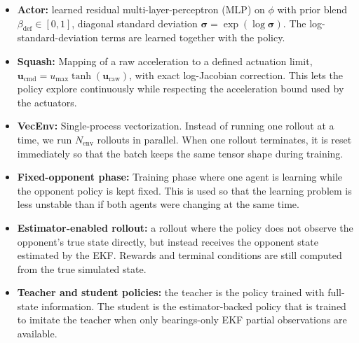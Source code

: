 \begin{itemize}
\item \textbf{Actor:} learned residual multi-layer-perceptron (MLP) on \(\phi\) with prior blend \(\beta_{\mathrm{def}}\in[0,1]\), diagonal standard deviation \(\boldsymbol{\sigma}=\exp(\log\boldsymbol{\sigma})\).  The log-standard-deviation terms are learned together with the policy.
\item \textbf{Squash:} Mapping of a raw  acceleration to a defined actuation limit, \(\mathbf{u}_{\mathrm{cmd}} = u_{\max}\tanh(\mathbf{u}_{\mathrm{raw}})\), with exact log-Jacobian correction. This lets the policy explore continuously while respecting the acceleration bound used by the actuators.
\item \textbf{VecEnv:} Single-process vectorization. Instead of running one rollout at a time, we run \(N_{\mathrm{env}}\) rollouts in parallel. When one rollout terminates, it is reset immediately so that the batch keeps the same tensor shape during training.

\item \textbf{Fixed-opponent phase:} Training phase where one agent is learning while the opponent policy is kept fixed. This is used so that the learning problem is less unstable than if both agents were changing at the same time.

\item \textbf{Estimator-enabled rollout:} a rollout where the policy does not observe the opponent's true state directly, but instead receives the opponent state estimated by the EKF. Rewards and terminal conditions are still computed from the true simulated state.

\item \textbf{Teacher and student policies:} the teacher is the policy trained with full-state information. The student is the estimator-backed policy that is trained to imitate the teacher when only bearings-only EKF partial observations are available.
\end{itemize}
